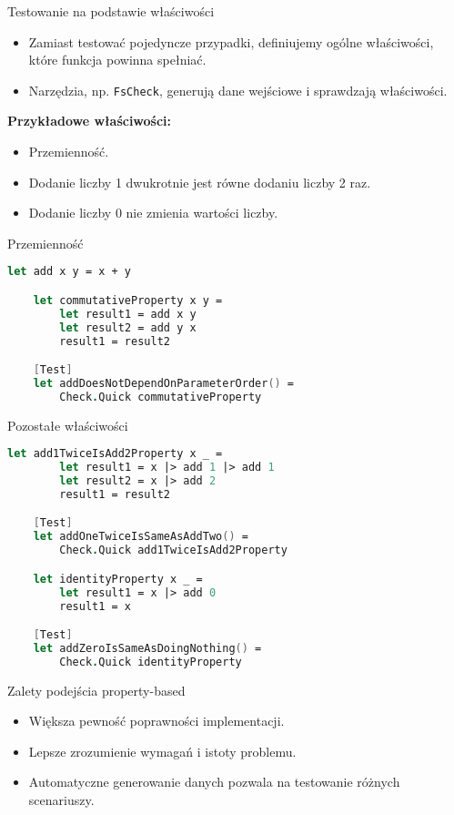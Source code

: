 \begin{frame}{Testowanie na podstawie właściwości}
    \begin{itemize}
        \item Zamiast testować pojedyncze przypadki, definiujemy ogólne właściwości, które funkcja powinna spełniać.
        \item Narzędzia, np. \texttt{FsCheck}, generują dane wejściowe i sprawdzają właściwości.
    \end{itemize}
    \textbf{Przykładowe właściwości:}
    \begin{itemize}
        \item Przemienność.
        \item Dodanie liczby 1 dwukrotnie jest równe dodaniu liczby 2 raz.
        \item Dodanie liczby 0 nie zmienia wartości liczby.
    \end{itemize}
\end{frame}


\begin{frame}[fragile]{Przemienność}
    \begin{lstlisting}[language=FSharp, xleftmargin=-10pt,xrightmargin=-10pt,numbers=none]
    let add x y = x + y

    let commutativeProperty x y =
        let result1 = add x y
        let result2 = add y x 
        result1 = result2

    [Test]
    let addDoesNotDependOnParameterOrder() =
        Check.Quick commutativeProperty
    \end{lstlisting}
\end{frame}

\begin{frame}[fragile]{Pozostałe właściwości}
    \begin{lstlisting}[language=FSharp, xleftmargin=-10pt,xrightmargin=-10pt,numbers=none, basicstyle=\ttfamily\small]
    let add1TwiceIsAdd2Property x _ =
        let result1 = x |> add 1 |> add 1
        let result2 = x |> add 2
        result1 = result2

    [Test]
    let addOneTwiceIsSameAsAddTwo() =
        Check.Quick add1TwiceIsAdd2Property

    let identityProperty x _ =
        let result1 = x |> add 0
        result1 = x

    [Test]
    let addZeroIsSameAsDoingNothing() =
        Check.Quick identityProperty
    \end{lstlisting}
\end{frame}

\begin{frame}{Zalety podejścia property-based}
    \begin{itemize}
        \item Większa pewność poprawności implementacji.
        \item Lepsze zrozumienie wymagań i istoty problemu.
        \item Automatyczne generowanie danych pozwala na testowanie różnych scenariuszy.
    \end{itemize}
\end{frame}